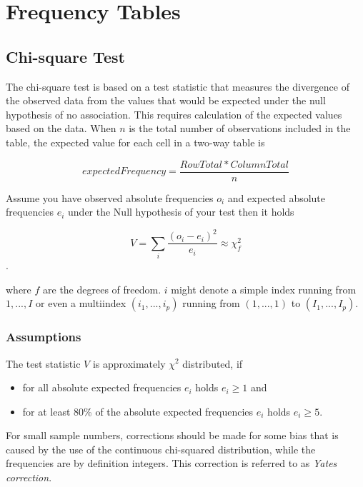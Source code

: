 \section{Frequency Tables} 

\subsection{Chi-square Test} 

The chi-square test is based on a test statistic that measures the divergence of the observed data from the values that would be expected under the null hypothesis of no association. This requires calculation of the expected values based on the data. When $n$ is the total number of observations included in the table, the expected value for each cell in a two-way table is

\begin{equation}
  expectedFrequency = \frac{RowTotal * ColumnTotal}{n}
\end{equation}

Assume you have observed absolute frequencies $o_i$ and expected absolute frequencies $e_i$ under the Null hypothesis of your test then it holds

\begin{equation}
  V = \sum_i \frac{(o_i-e_i)^2}{e_i} \approx \chi^2_f
\end{equation}.

where $f$ are the degrees of freedom. $i$ might denote a simple index running from $1,...,I$ or even a multiindex $(i_1,...,i_p)$ running from $(1,...,1)$ to $(I_1,...,I_p)$.

\subsubsection{Assumptions}
The test statistic $V$ is approximately $\chi^2$ distributed, if

\begin{itemize}
  \item for all absolute expected frequencies $e_i$ holds $e_i \geq 1$ and
  \item for at least 80\% of the absolute expected frequencies $e_i$ holds $e_i \geq 5$.
\end{itemize}

For small sample numbers, corrections should be made for some bias that is caused by the use of the continuous chi-squared distribution, while the frequencies are by definition integers. This correction is referred to as \emph{Yates correction}.

